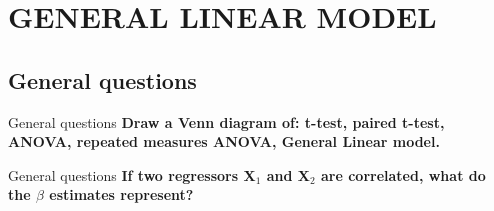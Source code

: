 \documentclass{beamer}
\begin{document}
\section{GENERAL LINEAR MODEL}

\subsection[General questions]{General questions}


\begin{frame}{General questions}
  \textbf{Draw a Venn diagram of: t-test, paired t-test, ANOVA, repeated measures ANOVA, General Linear model.}

\end{frame}

%


\begin{frame}{General questions}
  \textbf{If two regressors X$_{1}$ and X$_{2}$ are correlated, what do the $\beta$ estimates represent?}

%
\end{frame}

%
%
\end{document}
